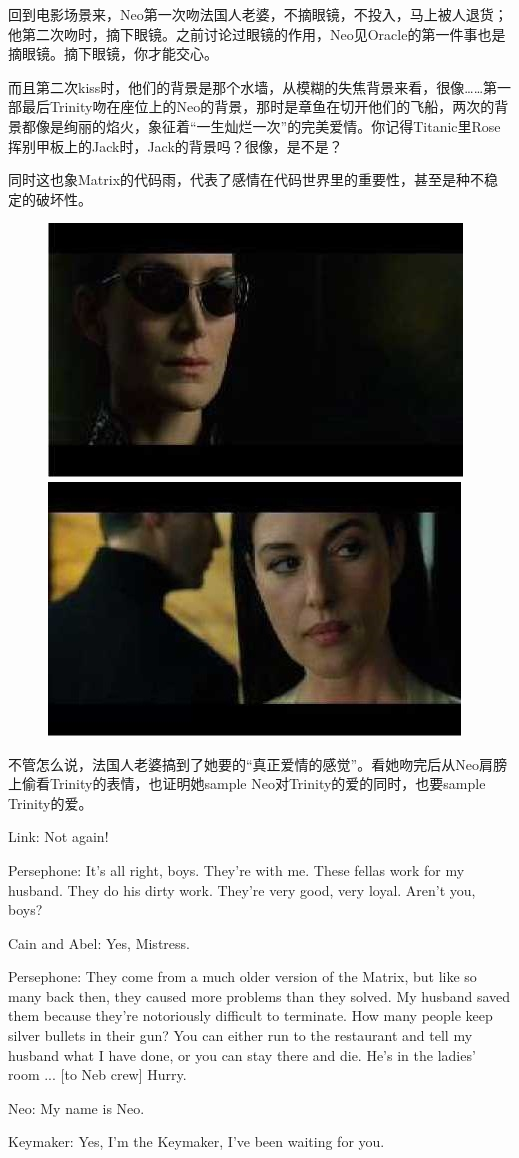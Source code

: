 \documentclass{ctexart}
\newenvironment{myquote}{\color{green} \setlength{\leftskip}{6em} \setlength{\rightskip}{4em} \setlength{\parindent}{-2em}}{\par}
\begin{document}
回到电影场景来，Neo第一次吻法国人老婆，不摘眼镜，不投入，马上被人退货；他第二次吻时，摘下眼镜。之前讨论过眼镜的作用，Neo见Oracle的第一件事也是摘眼镜。摘下眼镜，你才能交心。

而且第二次kiss时，他们的背景是那个水墙，从模糊的失焦背景来看，很像……第一部最后Trinity吻在座位上的Neo的背景，那时是章鱼在切开他们的飞船，两次的背景都像是绚丽的焰火，象征着“一生灿烂一次”的完美爱情。你记得Titanic里Rose挥别甲板上的Jack时，Jack的背景吗？很像，是不是？

同时这也象Matrix的代码雨，代表了感情在代码世界里的重要性，甚至是种不稳定的破坏性。

\begin{figure}[htb]
\centering
\includegraphics[width=0.45\linewidth]{fig/read_reloaded-107}
\includegraphics[width=0.45\linewidth]{fig/read_reloaded-107-1}
\end{figure}

不管怎么说，法国人老婆搞到了她要的“真正爱情的感觉”。看她吻完后从Neo肩膀上偷看Trinity的表情，也证明她sample Neo对Trinity的爱的同时，也要sample Trinity的爱。

\begin{myquote}
Link: Not again!

Persephone: It's all right, boys. They're with me. These fellas work for my husband. They do his dirty work. They're very good, very loyal. Aren't you, boys?

Cain and Abel: Yes, Mistress.

Persephone: They come from a much older version of the Matrix, but like so many back then, they caused more problems than they solved. My husband saved them because they're notoriously difficult to terminate. How many people keep silver bullets in their gun? You can either run to the restaurant and tell my husband what I have done, or you can stay there and die. He's in the ladies' room ... [to Neb crew] Hurry.

Neo: My name is Neo.

Keymaker: Yes, I'm the Keymaker, I've been waiting for you.
\end{myquote}
\end{document}
